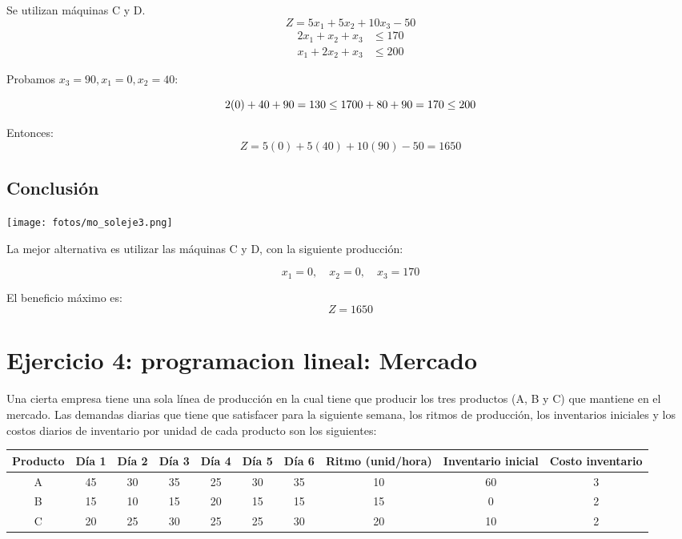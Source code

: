 \documentclass[12pt, a4paper, oneside]{book}
\theoremstyle{definition}
\begin{document}
    Se utilizan máquinas C y D.  
    \[
    Z = 5x_1 + 5x_2 + 10x_3 - 50
    \]
    \[
    \begin{aligned}
    2x_1 + x_2 + x_3 &\leq 170 \\
    x_1 + 2x_2 + x_3 &\leq 200
    \end{aligned}
    \]

    Probamos \(x_3 = 90, x_1 = 0, x_2 = 40\):

    \[
    2(0) + 40 + 90 = 130 \leq 170 \\
    0 + 80 + 90 = 170 \leq 200
    \]

    Entonces:  
    \[
    Z = 5(0) + 5(40) + 10(90) - 50 = 1650
    \]

    \subsection{Conclusión}

    \begin{center}
    \texttt{[image: fotos/mo\_soleje3.png]}
    \end{center}

    La mejor alternativa es utilizar las máquinas C y D, con la siguiente producción:

    \[
    x_1 = 0, \quad x_2 = 0, \quad x_3 = 170
    \]

    El beneficio máximo es:
    \[
    \boxed{Z = 1650}
    \]


    \newpage
    \section{Ejercicio 4: programacion lineal: Mercado}

    Una cierta empresa tiene una sola línea de producción en la cual tiene que producir los tres productos (A, B y C) que mantiene en el mercado. Las demandas diarias que tiene que satisfacer para la siguiente semana, los ritmos de producción, los inventarios iniciales y los costos diarios de inventario por unidad de cada producto son los siguientes:

    \begin{center}
    \begin{tabular}{|c|cccccc|c|c|c|}
    \hline
    \textbf{Producto} & \textbf{Día 1} & \textbf{Día 2} & \textbf{Día 3} & \textbf{Día 4} & \textbf{Día 5} & \textbf{Día 6} & \textbf{Ritmo (unid/hora)} & \textbf{Inventario inicial} & \textbf{Costo inventario} \\
    \hline
    A & 45 & 30 & 35 & 25 & 30 & 35 & 10 & 60 & 3 \\
    B & 15 & 10 & 15 & 20 & 15 & 15 & 15 & 0 & 2 \\
    C & 20 & 25 & 30 & 25 & 25 & 30 & 20 & 10 & 2 \\
    \hline
    \end{tabular}
    \end{center}
\end{document}
